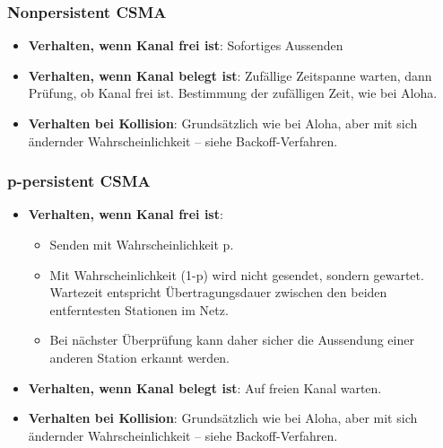 \documentclass{article} %
\begin{document}
\subsubsection{Nonpersistent CSMA}	
	\begin{itemize}		
	\item \textbf{Verhalten, wenn Kanal frei ist}: Sofortiges Aussenden	
	\item \textbf{Verhalten, wenn Kanal belegt ist}: Zufällige Zeitspanne warten, dann Prüfung, ob Kanal frei ist. Bestimmung der zufälligen Zeit, wie bei Aloha. 	
	\item \textbf{Verhalten bei Kollision}: Grundsätzlich wie bei Aloha, aber mit sich ändernder Wahrscheinlichkeit – siehe Backoff-Verfahren. 	
	\end{itemize}	
\subsubsection{p-persistent CSMA}		
	\begin{itemize}	
	\item \textbf{Verhalten, wenn Kanal frei ist}:
		\begin{itemize}
		\item Senden mit Wahrscheinlichkeit p. 
		\item Mit Wahrscheinlichkeit (1-p) wird nicht gesendet, sondern gewartet. Wartezeit entspricht Übertragungsdauer zwischen den beiden entferntesten Stationen im Netz. 
		\item Bei nächster Überprüfung kann daher sicher die Aussendung einer anderen Station erkannt werden. 
		\end{itemize}	
	\item \textbf{Verhalten, wenn Kanal belegt ist}: Auf freien Kanal warten.  	
	\item \textbf{Verhalten bei Kollision}: Grundsätzlich wie bei Aloha, aber mit sich ändernder Wahrscheinlichkeit – siehe Backoff-Verfahren. 	
	\end{itemize}
	
\end{document}
